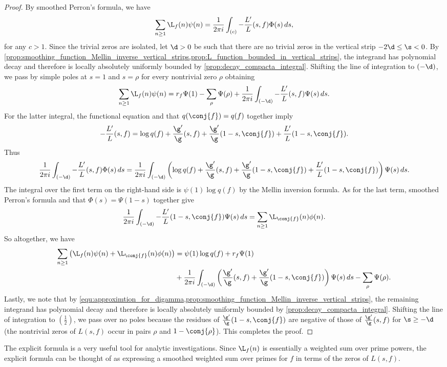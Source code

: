    \begin{proof}
      By smoothed Perron's formula, we have
      \[
        \sum_{n \ge 1}\L_{f}(n)\psi(n) = \frac{1}{2\pi i}\int_{(c)}-\frac{L'}{L}(s,f)\Phi(s)\,ds,
      \]
      for any $c > 1$. Since the trivial zeros are isolated, let $\d > 0$ be such that there are no trivial zeros in the vertical strip $-2\d \le \s < 0$. By \cref{prop:smoothing_function_Mellin_inverse_vertical_strips,prop:L_function_bounded_in_vertical_strips}, the integrand has polynomial decay and therefore is locally absolutely uniformly bounded by \cref{prop:decay_compacta_integral}. Shifting the line of integration to $(-\d)$, we pass by simple poles at $s = 1$ and $s = \rho$ for every nontrivial zero $\rho$ obtaining
      \[
        \sum_{n \ge 1}\L_{f}(n)\psi(n) = r_{f}\Psi(1)-\sum_{\rho}\Psi(\rho)+\frac{1}{2\pi i}\int_{(-\d)}-\frac{L'}{L}(s,f)\Psi(s)\,ds.
      \]
      For the latter integral, the functional equation and that $q(\conj{f}) = q(f)$ together imply
      \[
        -\frac{L'}{L}(s,f) = \log{q(f)}+\frac{\g'}{\g}(s,f)+\frac{\g'}{\g}(1-s,\conj{f})+\frac{L'}{L}(1-s,\conj{f}).
      \]
      Thus
      \[
        \frac{1}{2\pi i}\int_{(-\d)}-\frac{L'}{L}(s,f)\Phi(s)\,ds = \frac{1}{2\pi i}\int_{(-\d)}\left(\log{q(f)}+\frac{\g'}{\g}(s,f)+\frac{\g'}{\g}(1-s,\conj{f})+\frac{L'}{L}(1-s,\conj{f})\right)\Psi(s)\,ds.
      \]
      The integral over the first term on the right-hand side is $\psi(1)\log{q(f)}$ by the Mellin inversion formula. As for the last term, smoothed Perron's formula and that $\Phi(s) = \Psi(1-s)$ together give
      \[
        \frac{1}{2\pi i}\int_{(-\d)}-\frac{L'}{L}(1-s,\conj{f})\Psi(s)\,ds = \sum_{n \ge 1}\L_{\conj{f}}(n)\phi(n).
      \]
      So altogether, we have
      \begin{align*}
        \sum_{n \ge 1}\left(\L_{f}(n)\psi(n)+\L_{\conj{f}}(n)\phi(n)\right) &= \psi(1)\log{q(f)}+r_{f}\Psi(1) \\
        &+ \frac{1}{2\pi i}\int_{(-\d)}\left(\frac{\g'}{\g}(s,f)+\frac{\g'}{\g}(1-s,\conj{f})\right)\Psi(s)\,ds-\sum_{\rho}\Psi(\rho).
      \end{align*}
      Lastly, we note that by \cref{equ:approximtion_for_digamma,prop:smoothing_function_Mellin_inverse_vertical_strips}, the remaining integrand has polynomial decay and therefore is locally absolutely uniformly bounded by \cref{prop:decay_compacta_integral}. Shifting the line of integration to $\left(\frac{1}{2}\right)$, we pass over no poles because the residues of $\frac{\g'}{\g}(1-s,\conj{f})$ are negative of those of $\frac{\g'}{\g}(s,f)$ for $\s \ge -\d$ (the nontrivial zeros of $L(s,f)$ occur in pairs $\rho$ and $1-\conj{\rho}$). This completes the proof. 
    \end{proof}

    The explicit formula is a very useful tool for analytic investigations. Since $\L_{f}(n)$ is essentially a weighted sum over prime powers, the explicit formula can be thought of as expressing a smoothed weighted sum over primes for $f$ in terms of the zeros of $L(s,f)$.